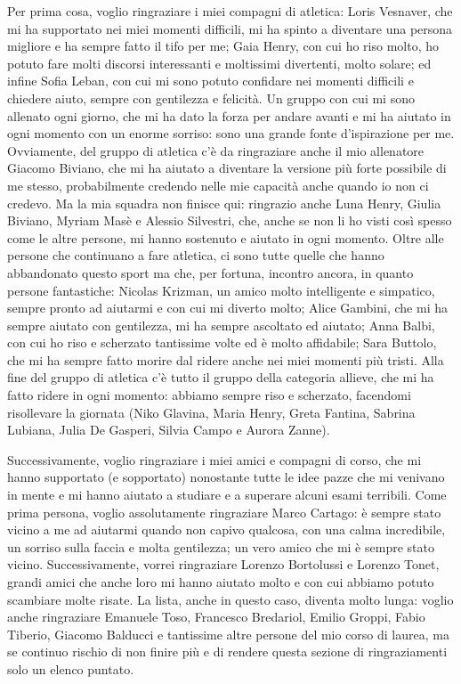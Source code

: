 \documentclass[12pt]{book}
\begin{document}
Per prima cosa, voglio ringraziare i miei compagni di atletica: Loris Vesnaver, che mi ha supportato nei miei momenti difficili, mi ha spinto a diventare una persona migliore e ha sempre fatto il tifo per me; Gaia Henry, con cui ho riso molto, ho potuto fare molti discorsi interessanti e moltissimi divertenti, molto solare; ed infine Sofia Leban, con cui mi sono potuto confidare nei momenti difficili e chiedere aiuto, sempre con gentilezza e felicità. Un gruppo con cui mi sono allenato ogni giorno, che mi ha dato la forza per andare avanti e mi ha aiutato in ogni momento con un enorme sorriso: sono una grande fonte d’ispirazione per me.
Ovviamente, del gruppo di atletica c’è da ringraziare anche il mio allenatore Giacomo Biviano, che mi ha aiutato a diventare la versione più forte possibile di me stesso, probabilmente credendo nelle mie capacità anche quando io non ci credevo.
Ma la mia squadra non finisce qui: ringrazio anche Luna Henry, Giulia Biviano, Myriam Masè e Alessio Silvestri, che, anche se non li ho visti così spesso come le altre persone, mi hanno sostenuto e aiutato in ogni momento.
Oltre alle persone che continuano a fare atletica, ci sono tutte quelle che hanno abbandonato questo sport ma che, per fortuna, incontro ancora, in quanto persone fantastiche: Nicolas Krizman, un amico molto intelligente e simpatico, sempre pronto ad aiutarmi e con cui mi diverto molto; Alice Gambini, che mi ha sempre aiutato con gentilezza, mi ha sempre ascoltato ed aiutato; Anna Balbi, con cui ho riso e scherzato tantissime volte ed è molto affidabile; Sara Buttolo, che mi ha sempre fatto morire dal ridere anche nei miei momenti più tristi.
Alla fine del gruppo di atletica c’è tutto il gruppo della categoria allieve, che mi ha fatto ridere in ogni momento: abbiamo sempre riso e scherzato, facendomi risollevare la giornata (Niko Glavina, Maria Henry, Greta Fantina, Sabrina Lubiana, Julia De Gasperi, Silvia Campo e Aurora Zanne).

Successivamente, voglio ringraziare i miei amici e compagni di corso, che mi hanno supportato (e sopportato) nonostante tutte le idee pazze che mi venivano in mente e mi hanno aiutato a studiare e a superare alcuni esami terribili.
Come prima persona, voglio assolutamente ringraziare Marco Cartago: è sempre stato vicino a me ad aiutarmi quando non capivo qualcosa, con una calma incredibile, un sorriso sulla faccia e molta gentilezza; un vero amico che mi è sempre stato vicino.
Successivamente, vorrei ringraziare Lorenzo Bortolussi e Lorenzo Tonet, grandi amici che anche loro mi hanno aiutato molto e con cui abbiamo potuto scambiare molte risate.
La lista, anche in questo caso, diventa molto lunga: voglio anche ringraziare Emanuele Toso, Francesco Bredariol, Emilio Groppi, Fabio Tiberio, Giacomo Balducci e tantissime altre persone del mio corso di laurea, ma se continuo rischio di non finire più e di rendere questa sezione di ringraziamenti solo un elenco puntato.
\end{document}
